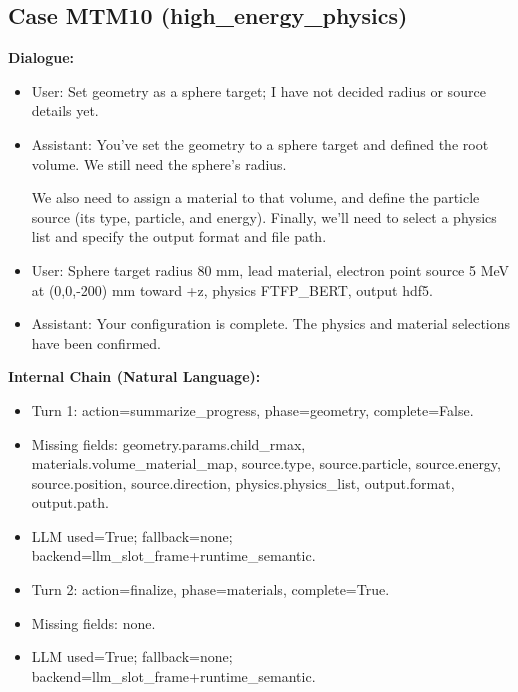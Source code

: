 \documentclass[11pt]{ctexart}
\begin{document}
\subsection{Case MTM10 (high\_energy\_physics)}
\textbf{Dialogue:}
\begin{itemize}
\item User: Set geometry as a sphere target; I have not decided radius or source details yet.
\item Assistant: You've set the geometry to a sphere target and defined the root volume. We still need the sphere's radius.

We also need to assign a material to that volume, and define the particle source (its type, particle, and energy). Finally, we'll need to select a physics list and specify the output format and file path.
\item User: Sphere target radius 80 mm, lead material, electron point source 5 MeV at (0,0,-200) mm toward +z, physics FTFP\_BERT, output hdf5.
\item Assistant: Your configuration is complete. The physics and material selections have been confirmed.
\end{itemize}
\textbf{Internal Chain (Natural Language):}
\begin{itemize}
\item Turn 1: action=summarize\_progress, phase=geometry, complete=False.
\item Missing fields: geometry.params.child\_rmax, materials.volume\_material\_map, source.type, source.particle, source.energy, source.position, source.direction, physics.physics\_list, output.format, output.path.
\item LLM used=True; fallback=none; backend=llm\_slot\_frame+runtime\_semantic.
\item Turn 2: action=finalize, phase=materials, complete=True.
\item Missing fields: none.
\item LLM used=True; fallback=none; backend=llm\_slot\_frame+runtime\_semantic.
\end{itemize}
\end{document}
